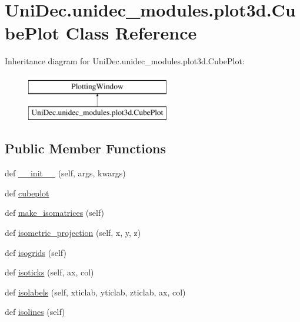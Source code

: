 \hypertarget{class_uni_dec_1_1unidec__modules_1_1plot3d_1_1_cube_plot}{}\section{Uni\+Dec.\+unidec\+\_\+modules.\+plot3d.\+Cube\+Plot Class Reference}
\label{class_uni_dec_1_1unidec__modules_1_1plot3d_1_1_cube_plot}
Inheritance diagram for Uni\+Dec.\+unidec\+\_\+modules.\+plot3d.\+Cube\+Plot\+:\begin{figure}[H]
\begin{center}
\leavevmode
\includegraphics[height=2.000000cm]{class_uni_dec_1_1unidec__modules_1_1plot3d_1_1_cube_plot}
\end{center}
\end{figure}
\subsection*{Public Member Functions}
\begin{DoxyCompactItemize}
\item 
def \hyperlink{class_uni_dec_1_1unidec__modules_1_1plot3d_1_1_cube_plot_a9a743875cd247c57f865fde245b2ca09}{\+\_\+\+\_\+init\+\_\+\+\_\+} (self, args, kwargs)
\item 
def \hyperlink{class_uni_dec_1_1unidec__modules_1_1plot3d_1_1_cube_plot_a8c02b303139191d97f0ee5235d792e4d}{cubeplot}
\item 
def \hyperlink{class_uni_dec_1_1unidec__modules_1_1plot3d_1_1_cube_plot_aec9b08b9344b90b2c6dabb17d12b6a56}{make\+\_\+isomatrices} (self)
\item 
def \hyperlink{class_uni_dec_1_1unidec__modules_1_1plot3d_1_1_cube_plot_a752c5cc5cde2c3c2f940f226b2524735}{isometric\+\_\+projection} (self, x, y, z)
\item 
def \hyperlink{class_uni_dec_1_1unidec__modules_1_1plot3d_1_1_cube_plot_ad28ab5f561275c28ca64dc8bae18690b}{isogrids} (self)
\item 
def \hyperlink{class_uni_dec_1_1unidec__modules_1_1plot3d_1_1_cube_plot_a60d357a3567507f93027ca437149a042}{isoticks} (self, ax, col)
\item 
def \hyperlink{class_uni_dec_1_1unidec__modules_1_1plot3d_1_1_cube_plot_aae1f98baa6e71e13956bf4ed9c16e312}{isolabels} (self, xticlab, yticlab, zticlab, ax, col)
\item 
def \hyperlink{class_uni_dec_1_1unidec__modules_1_1plot3d_1_1_cube_plot_a8665eda43d413cad20e726ed4ba4108f}{isolines} (self)
\end{DoxyCompactItemize}
